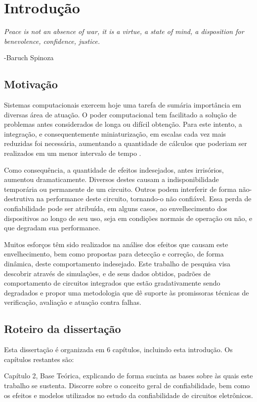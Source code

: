 \chapter{Introdução}
\epigraph{\textit{Peace is not an absence of war, it is a virtue, a state of mind, a disposition for benevolence, confidence, justice.}}{-Baruch Spinoza}
\section{Motivação}
Sistemas computacionais exercem hoje uma tarefa de sumária importância em diversas área de atuação. O poder computacional tem facilitado a solução de problemas antes considerados de longa ou difícil obtenção. Para este intento, a integração, e consequentemente miniaturização, em escalas cada vez mais reduzidas foi necessária, aumentando a quantidade de cálculos que poderiam ser realizados em um menor intervalo de tempo \cite{Moore1965}.

Como consequência, a quantidade de efeitos indesejados, antes irrisórios, aumentou dramaticamente. Diversos destes causam a indisponibilidade temporária ou permanente de um circuito. Outros podem interferir de forma não-destrutiva na performance deste circuito, tornando-o não confiável.
Essa perda de confiabilidade pode ser atribuída, em alguns casos, ao envelhecimento dos dispositivos ao longo de seu uso, seja em condições normais de operação ou não, e que degradam sua performance.

Muitos esforços têm sido realizados na análise dos efeitos que causam este envelhecimento, bem como propostas para detecção e correção, de forma dinâmica, deste comportamento indesejado. Este trabalho de pesquisa visa descobrir através de simulações, e de seus dados obtidos, padrões de comportamento de circuitos integrados que estão gradativamente sendo degradados e propor uma metodologia que dê suporte às promissoras técnicas de verificação, avaliação e atuação contra falhas.
\section{Roteiro da dissertação}
Esta dissertação é organizada em 6 capítulos, incluindo esta introdução. Os capítulos restantes são:

Capítulo 2, Base Teórica, explicando de forma sucinta as bases sobre às quais este trabalho se sustenta. Discorre sobre o conceito geral de confiabilidade, bem como os efeitos e modelos utilizados no estudo da confiabilidade de circuitos eletrônicos.

